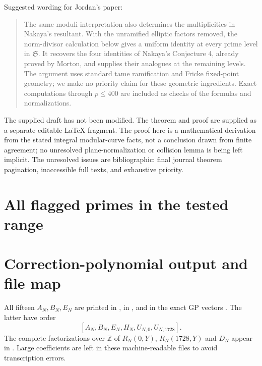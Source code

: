 \documentclass[11pt,a4paper]{article}
\begin{document}
Suggested wording for Jordan's paper:
\begin{quote}
The same moduli interpretation also determines the multiplicities in Nakaya's resultant. With the unramified elliptic factors removed, the norm-divisor calculation below gives a uniform identity at every prime level in $\mathfrak S$. It recovers the four identities of Nakaya's Conjecture 4, already proved by Morton, and supplies their analogues at the remaining levels. The argument uses standard tame ramification and Fricke fixed-point geometry; we make no priority claim for these geometric ingredients. Exact computations through $p\le400$ are included as checks of the formulas and normalizations.
\end{quote}
The supplied draft has not been modified. The theorem and proof are supplied as a separate editable LaTeX fragment. The proof here is a mathematical derivation from the stated integral modular-curve facts, not a conclusion drawn from finite agreement; no unresolved plane-normalization or collision lemma is being left implicit. The unresolved issues are bibliographic: final journal theorem pagination, inaccessible full texts, and exhaustive priority.

\appendix
\section{All flagged primes in the tested range}

\section{Correction-polynomial output and file map}
All fifteen $A_N,B_N,E_N$ are printed in , in
, and in the exact GP vectors
. The latter have order
\[ [A_N,B_N,E_N,H_N,U_{N,0},U_{N,1728}]. \]
The complete factorizations over $\mathbb Z$ of $R_N(0,Y)$, $R_N(1728,Y)$ and $D_N$ appear in . Large coefficients are left in these machine-readable files to avoid transcription errors.
\end{document}
